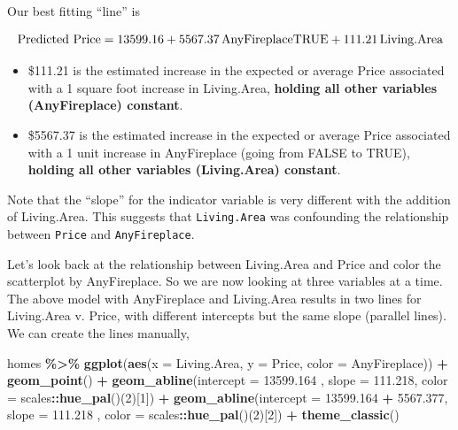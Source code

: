 \documentclass[
]{book}
\newenvironment{Shaded}{\begin{snugshade}}{\end{snugshade}}
\newcommand{\AttributeTok}[1]{\textcolor[rgb]{0.13,0.29,0.53}{#1}}
\newcommand{\DecValTok}[1]{\textcolor[rgb]{0.00,0.00,0.81}{#1}}
\newcommand{\FloatTok}[1]{\textcolor[rgb]{0.00,0.00,0.81}{#1}}
\newcommand{\FunctionTok}[1]{\textcolor[rgb]{0.13,0.29,0.53}{\textbf{#1}}}
\newcommand{\NormalTok}[1]{#1}
\newcommand{\SpecialCharTok}[1]{\textcolor[rgb]{0.81,0.36,0.00}{\textbf{#1}}}
\begin{document}
Our best fitting ``line'' is

\[\hbox{Predicted Price} = 13599.16 + 5567.37\,\hbox{AnyFireplaceTRUE} + 111.21\,\hbox{Living.Area}\]

\begin{itemize}
\item
  \$111.21 is the estimated increase in the expected or average Price associated with a 1 square foot increase in Living.Area, \textbf{holding all other variables (AnyFireplace) constant}.
\item
  \$5567.37 is the estimated increase in the expected or average Price associated with a 1 unit increase in AnyFireplace (going from FALSE to TRUE), \textbf{holding all other variables (Living.Area) constant}.
\end{itemize}

Note that the ``slope'' for the indicator variable is very different with the addition of Living.Area. This suggests that \texttt{Living.Area} was confounding the relationship between \texttt{Price} and \texttt{AnyFireplace}.

Let's look back at the relationship between Living.Area and Price and color the scatterplot by AnyFireplace. So we are now looking at three variables at a time. The above model with AnyFireplace and Living.Area results in two lines for Living.Area v. Price, with different intercepts but the same slope (parallel lines). We can create the lines manually,

\begin{Shaded}
\begin{Highlighting}[]
\NormalTok{homes }\SpecialCharTok{\%\textgreater{}\%}
    \FunctionTok{ggplot}\NormalTok{(}\FunctionTok{aes}\NormalTok{(}\AttributeTok{x =}\NormalTok{ Living.Area, }\AttributeTok{y =}\NormalTok{ Price, }\AttributeTok{color =}\NormalTok{ AnyFireplace)) }\SpecialCharTok{+} 
    \FunctionTok{geom\_point}\NormalTok{() }\SpecialCharTok{+}
    \FunctionTok{geom\_abline}\NormalTok{(}\AttributeTok{intercept =} \FloatTok{13599.164}\NormalTok{ , }\AttributeTok{slope =} \FloatTok{111.218}\NormalTok{, }\AttributeTok{color =}\NormalTok{ scales}\SpecialCharTok{::}\FunctionTok{hue\_pal}\NormalTok{()(}\DecValTok{2}\NormalTok{)[}\DecValTok{1}\NormalTok{]) }\SpecialCharTok{+}
    \FunctionTok{geom\_abline}\NormalTok{(}\AttributeTok{intercept =} \FloatTok{13599.164} \SpecialCharTok{+} \FloatTok{5567.377}\NormalTok{, }\AttributeTok{slope =} \FloatTok{111.218}\NormalTok{ , }\AttributeTok{color =}\NormalTok{ scales}\SpecialCharTok{::}\FunctionTok{hue\_pal}\NormalTok{()(}\DecValTok{2}\NormalTok{)[}\DecValTok{2}\NormalTok{]) }\SpecialCharTok{+}
    \FunctionTok{theme\_classic}\NormalTok{()}
\end{Highlighting}
\end{Shaded}
\end{document}
